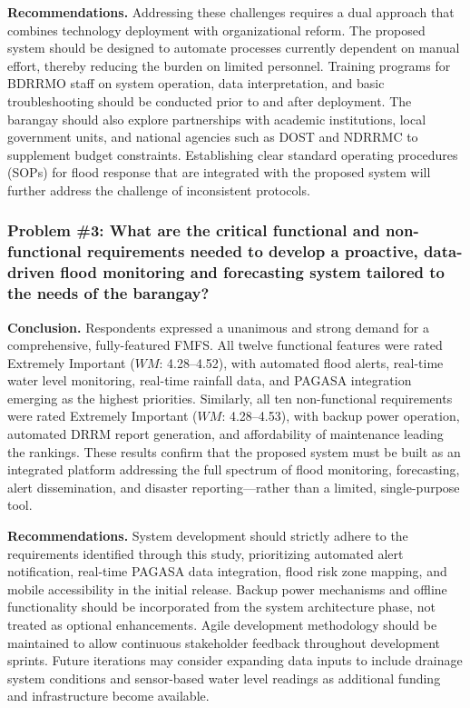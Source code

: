 \documentclass{research}
\begin{document}
\textbf{Recommendations.} Addressing these challenges requires a dual approach that
combines technology deployment with organizational reform. The proposed system
should be designed to automate processes currently dependent on manual effort,
thereby reducing the burden on limited personnel. Training programs for BDRRMO
staff on system operation, data interpretation, and basic troubleshooting should be
conducted prior to and after deployment. The barangay should also explore
partnerships with academic institutions, local government units, and national agencies
such as DOST and NDRRMC to supplement budget constraints. Establishing clear
standard operating procedures (SOPs) for flood response that are integrated with the
proposed system will further address the challenge of inconsistent protocols.

\subsubsection*{Problem \#3: What are the critical functional and non-functional requirements needed to develop a proactive, data-driven flood monitoring and forecasting system tailored to the needs of the barangay?}

\textbf{Conclusion.} Respondents expressed a unanimous and strong demand for a
comprehensive, fully-featured FMFS. All twelve functional features were rated
Extremely Important ($WM$: 4.28--4.52), with automated flood alerts, real-time water
level monitoring, real-time rainfall data, and PAGASA integration emerging as the
highest priorities. Similarly, all ten non-functional requirements were rated Extremely
Important ($WM$: 4.28--4.53), with backup power operation, automated DRRM report
generation, and affordability of maintenance leading the rankings. These results
confirm that the proposed system must be built as an integrated platform addressing
the full spectrum of flood monitoring, forecasting, alert dissemination, and disaster
reporting---rather than a limited, single-purpose tool.

\textbf{Recommendations.} System development should strictly adhere to the
requirements identified through this study, prioritizing automated alert notification,
real-time PAGASA data integration, flood risk zone mapping, and mobile accessibility
in the initial release. Backup power mechanisms and offline functionality should be
incorporated from the system architecture phase, not treated as optional enhancements.
Agile development methodology should be maintained to allow continuous stakeholder
feedback throughout development sprints. Future iterations may consider expanding
data inputs to include drainage system conditions and sensor-based water level
readings as additional funding and infrastructure become available.
\end{document}

